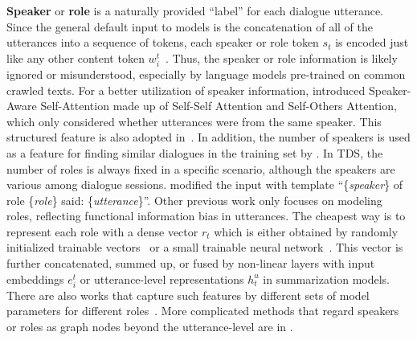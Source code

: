 \textbf{Speaker} or \textbf{role} is a naturally provided ``label'' for each dialogue utterance. 
Since the general default input to models is the concatenation of all of 
the utterances into a sequence of tokens, each speaker or role token $s_t$ 
is encoded just like any other content token $w_i^t$~\cite{chen2020multi,feng2021language}. Thus, the speaker or role 
information is likely ignored or misunderstood, especially by language models pre-trained 
on common crawled texts. 
For a better utilization of speaker information, \citet{lei2021hierarchical} introduced Speaker-Aware Self-Attention made up of Self-Self Attention and Self-Others Attention, which only considered whether utterances were from the same speaker. This structured feature is also 
adopted in~\cite{lei2021finer}.
In addition, the number of speakers is used as a feature for 
finding similar dialogues in the training set by \citet{prodan2021prompt}.
In TDS, the number of roles is always fixed in a specific scenario, although the speakers are various among dialogue sessions.
\cite{yang2022tanet} modified the input with template ``\{\textit{speaker}\} of role \{\textit{role}\} said: \{\textit{utterance}\}''.
Other previous work only focuses on modeling roles, reflecting functional information bias in utterances. 
The cheapest way is to represent each role with a dense vector $r_t$ which is either obtained by randomly initialized trainable vectors~\cite{zhu2020end,duan2019legal,qi2021improving,gan2021inspectional,asi2022end} or a small trainable neural network~\cite{song2020summarizing}. This vector is further concatenated, summed up, or fused by non-linear layers with input embeddings $e_i^t$ or utterance-level representations $h_t^u$ in summarization models. 
There are also works that capture such features by different sets of model parameters for different roles~\cite{zou2021topic,zhang2020unsupervised,yuan2019scaffolds}. More complicated methods that regard speakers or roles as graph nodes beyond the utterance-level are in .



